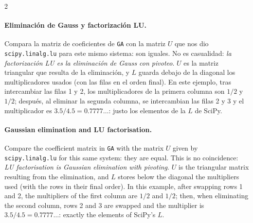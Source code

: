 \begin{paracol}{2}
\paragraph{Eliminación de Gauss y factorización LU.} Compara la matriz de coeficientes de \texttt{GA} con la matriz $U$ que nos dio \texttt{scipy.linalg.lu} para este mismo sistema: son iguales. No es casualidad: \emph{la factorización LU es la eliminación de Gauss con pivoteo}. $U$ es la matriz triangular que resulta de la eliminación, y $L$ guarda debajo de la diagonal los multiplicadores usados (con las filas en el orden final). En este ejemplo, tras intercambiar las filas 1 y 2, los multiplicadores de la primera columna son $1/2$ y $1/2$; después, al eliminar la segunda columna, se intercambian las filas 2 y 3 y el multiplicador es $3.5/4.5=0.7777\ldots$: justo los elementos de la $L$ de SciPy.

\switchcolumn
\paragraph{Gaussian elimination and LU factorisation.} Compare the coefficient matrix in \texttt{GA} with the matrix $U$ given by \texttt{scipy.linalg.lu} for this same system: they are equal. This is no coincidence: \emph{LU factorisation is Gaussian elimination with pivoting}. $U$ is the triangular matrix resulting from the elimination, and $L$ stores below the diagonal the multipliers used (with the rows in their final order). In this example, after swapping rows 1 and 2, the multipliers of the first column are $1/2$ and $1/2$; then, when eliminating the second column, rows 2 and 3 are swapped and the multiplier is $3.5/4.5=0.7777\ldots$: exactly the elements of SciPy's $L$.
\end{paracol}

